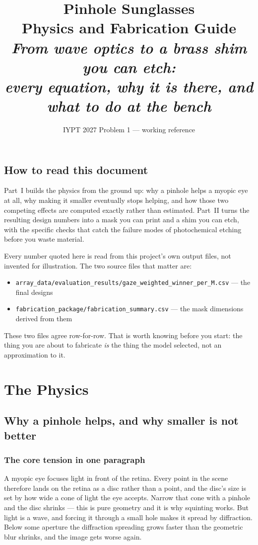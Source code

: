 \documentclass[11pt]{report}
\title{\textbf{\Huge Pinhole Sunglasses}\\[0.3cm]
\textcolor{hbblue}{\huge Physics and Fabrication Guide}\\[0.5cm]
\large\itshape From wave optics to a brass shim you can etch:\\
every equation, why it is there, and what to do at the bench}
\author{}
\date{IYPT 2027 Problem 1 --- working reference}
\begin{document}
\maketitle
\tableofcontents

\chapter*{How to read this document}

Part~I builds the physics from the ground up: why a pinhole helps a myopic eye at all,
why making it smaller eventually stops helping, and how those two competing effects are
computed exactly rather than estimated. Part~II turns the resulting design numbers into
a mask you can print and a shim you can etch, with the specific checks that catch the
failure modes of photochemical etching before you waste material.

Every number quoted here is read from this project's own output files, not invented for
illustration. The two source files that matter are:

\begin{itemize}[leftmargin=1.2cm]
\item \texttt{array\_data/evaluation\_results/gaze\_weighted\_winner\_per\_M.csv} --- the final designs
\item \texttt{fabrication\_package/fabrication\_summary.csv} --- the mask dimensions derived from them
\end{itemize}

These two files agree row-for-row. That is worth knowing before you start: the thing you
are about to fabricate \emph{is} the thing the model selected, not an approximation to it.

\part{The Physics}

\chapter{Why a pinhole helps, and why smaller is not better}

\section{The core tension in one paragraph}

A myopic eye focuses light in front of the retina. Every point in the scene therefore lands
on the retina as a disc rather than a point, and the disc's size is set by how wide a cone
of light the eye accepts. Narrow that cone with a pinhole and the disc shrinks --- this is
pure geometry and it is why squinting works. But light is a wave, and forcing it through a
small hole makes it spread by diffraction. Below some aperture the diffraction spreading
grows faster than the geometric blur shrinks, and the image gets worse again.
\end{document}
